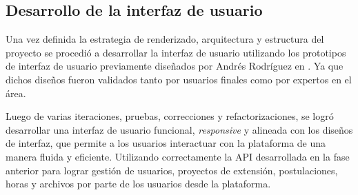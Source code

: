 \subsection{Desarrollo de la interfaz de usuario}
Una vez definida la estrategia de renderizado, arquitectura y estructura del proyecto se procedió a desarrollar la
interfaz de usuario utilizando los prototipos de interfaz de usuario previamente diseñados por Andrés Rodríguez en
\cite{Rodríguez_Dis_2023}. Ya que dichos diseños fueron validados tanto por usuarios finales como por expertos en el área.

Luego de varias iteraciones, pruebas, correcciones y refactorizaciones, se logró desarrollar una interfaz de usuario funcional,
\textit{responsive} y alineada con los diseños de interfaz, que permite a los usuarios interactuar con la plataforma de una manera
fluida y eficiente. Utilizando correctamente la API desarrollada en la fase anterior para lograr gestión de usuarios, proyectos de
extensión, postulaciones, horas y archivos por parte de los usuarios desde la plataforma.


